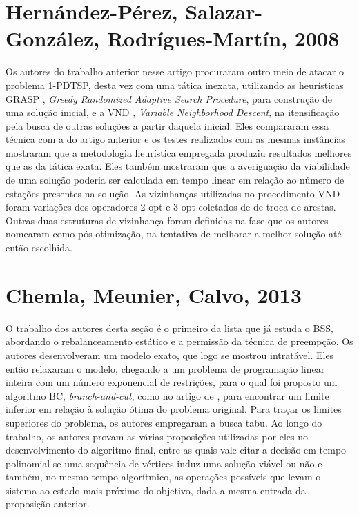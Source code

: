 \section{Hernández-Pérez, Salazar-González, Rodrígues-Martín, 2008}\label{sec:LABEL_CHP_2_SEC_B}

Os autores do trabalho anterior nesse artigo procuraram outro meio de atacar o problema 1-PDTSP, desta vez com uma tática inexata, utilizando as heurísticas GRASP \citep{resende:1}, \textit{Greedy Randomized Adaptive Search Procedure}, para construção de uma solução inicial, e a VND \citep{art:REF_ART_8}, \textit{Variable Neighborhood Descent}, na itensificação pela busca de outras soluções a partir daquela inicial. Eles compararam essa técnica com a do artigo anterior e os testes realizados com as mesmas instâncias mostraram que a metodologia heurística empregada produziu resultados melhores que as da tática exata. Eles também mostraram que a averiguação da viabilidade de uma solução poderia ser calculada em tempo linear em relação ao número de estações presentes na solução. As vizinhanças utilizadas no procedimento VND foram variações dos operadores 2-opt e 3-opt coletados de \citep{JohnMcGe97} de troca de arestas. Outras duas estruturas de vizinhança foram definidas na fase que os autores nomearam como pós-otimização, na tentativa de melhorar a melhor solução até então escolhida.

\section{Chemla, Meunier, Calvo, 2013}\label{sec:LABEL_CHP_2_SEC_C}

O trabalho dos autores desta seção é o primeiro da lista que já estuda o BSS, abordando o rebalanceamento estático e a permissão da técnica de preempção. Os autores desenvolveram um modelo exato, que logo se mostrou intratável. Eles então relaxaram o modelo, chegando a um problema de programação linear inteira com um número exponencial de restrições, para o qual foi proposto um algoritmo BC,  \textit{branch-and-cut}, como no artigo de \citet{art:REF_ART_3}, para encontrar um limite inferior em relação à solução ótima do problema original. Para traçar os limites superiores do problema, os autores empregaram a busca tabu. Ao longo do trabalho, os autores provam as várias proposições utilizadas por eles no desenvolvimento do algoritmo final, entre as quais vale citar a decisão em tempo polinomial se uma sequência de vértices induz uma solução viável ou não e também, no mesmo tempo algorítmico, as operações possíveis que levam o sistema ao estado mais próximo do objetivo, dada a mesma entrada da proposição anterior.

